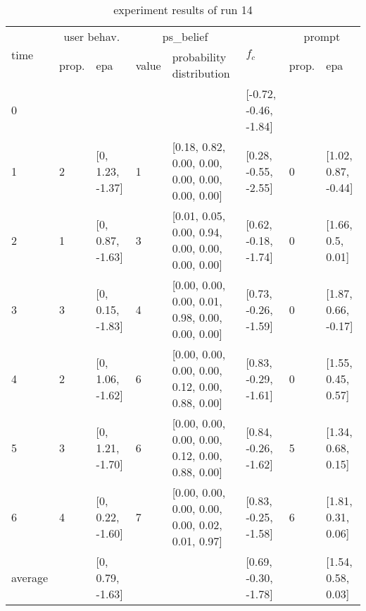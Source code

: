\begin{table}[htbp]\footnotesize
\caption{experiment results of run 14}
\begin{tabular}{|p{0.4cm}|p{0.6cm}|l|p{0.6cm}|p{3.3cm}|l|p{0.6cm}|l|}
\hline

\multirow{2}{*}{time} & \multicolumn{2}{c|}{user behav.} & \multicolumn{2}{c|}{ps\_belief} &
\multirow{2}{*}{$f_c$} & \multicolumn{2}{c|}{prompt} \\ \cline{2-5}\cline{ 7- 8}
& prop. & epa & value & probability distribution &  & prop. & epa \\ \hline

0 & \multicolumn{1}{l|}{} &  & \multicolumn{1}{l|}{} &  & [-0.72, -0.46, -1.84] & \multicolumn{1}{l|}{} &  \\ \hline
1 & 2 & [0, 1.23, -1.37] & 1 & [0.18, 0.82, 0.00, 0.00, 0.00, 0.00, 0.00, 0.00] & [0.28, -0.55, -2.55] & 0 & [1.02, 0.87, -0.44] \\ \hline
2 & 1 & [0, 0.87, -1.63] & 3 & [0.01, 0.05, 0.00, 0.94, 0.00, 0.00, 0.00, 0.00] & [0.62, -0.18, -1.74] & 0 & [1.66, 0.5, 0.01] \\ \hline
3 & 3 & [0, 0.15, -1.83] & 4 & [0.00, 0.00, 0.00, 0.01, 0.98, 0.00, 0.00, 0.00] & [0.73, -0.26, -1.59] & 0 & [1.87, 0.66, -0.17] \\ \hline
4 & 2 & [0, 1.06, -1.62] & 6 & [0.00, 0.00, 0.00, 0.00, 0.12, 0.00, 0.88, 0.00] & [0.83, -0.29, -1.61] & 0 & [1.55, 0.45, 0.57] \\ \hline
5 & 3 & [0, 1.21, -1.70] & 6 & [0.00, 0.00, 0.00, 0.00, 0.12, 0.00, 0.88, 0.00] & [0.84, -0.26, -1.62] & 5 & [1.34, 0.68, 0.15] \\ \hline
6 & 4 & [0, 0.22, -1.60] & 7 & [0.00, 0.00, 0.00, 0.00, 0.00, 0.02, 0.01, 0.97] & [0.83, -0.25, -1.58] & 6 & [1.81, 0.31, 0.06] \\ \hline
\multicolumn{1}{|l|}{average} & \multicolumn{1}{l|}{} & [0, 0.79, -1.63] & \multicolumn{1}{l|}{} &  & [0.69, -0.30, -1.78] & \multicolumn{1}{l|}{} & [1.54, 0.58, 0.03] \\ \hline
\end{tabular}
\label{}
\end{table}



